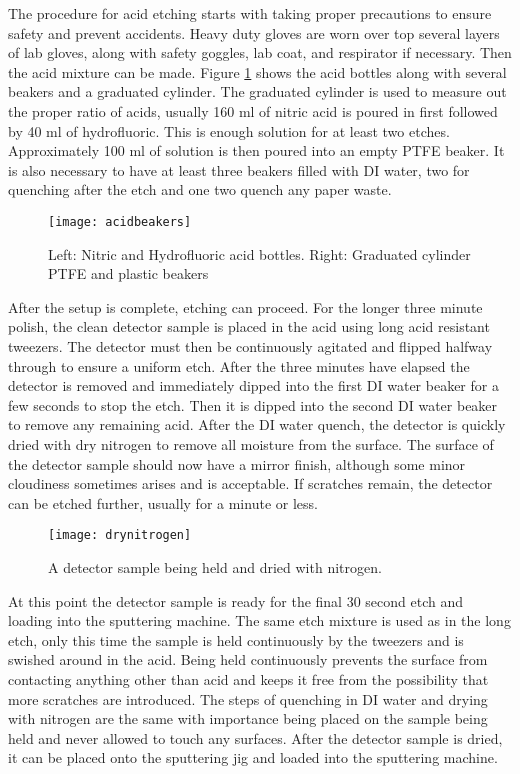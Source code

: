 The procedure for acid etching starts with taking proper precautions to ensure safety and prevent accidents.
Heavy duty gloves are worn over top several layers of lab gloves, along with safety goggles, lab coat, and respirator if necessary.
Then the acid mixture can be made.
Figure \ref{fig:acidbeakers} shows the acid bottles along with several beakers and a graduated cylinder.
The graduated cylinder is used to measure out the proper ratio of acids, usually 160 ml of nitric acid is poured in first followed by 40 ml of hydrofluoric.
This is enough solution for at least two etches.
Approximately 100 ml of solution is then poured into an empty PTFE beaker.
It is also necessary to have at least three beakers filled with DI water, two for quenching after the etch and one two quench any paper waste.
\begin{figure}[htpb]
\centering
\texttt{[image: acidbeakers]}
\caption{Left: Nitric and Hydrofluoric acid bottles. Right: Graduated cylinder PTFE and plastic beakers}
\label{fig:acidbeakers}
\end{figure}
After the setup is complete, etching can proceed.
For the longer three minute polish, the clean detector sample is placed in the acid using long acid resistant tweezers.
The detector must then be continuously agitated and flipped halfway through to ensure a uniform etch.
After the three minutes have elapsed the detector is removed and immediately dipped into the first DI water beaker for a few seconds to stop the etch.
Then it is dipped into the second DI water beaker to remove any remaining acid.
After the DI water quench, the detector is quickly dried with dry nitrogen to remove all moisture from the surface.
The surface of the detector sample should now have a mirror finish, although some minor cloudiness sometimes arises and is acceptable.
If scratches remain, the detector can be etched further, usually for a minute or less.
\begin{figure}[htpb]
\centering
\texttt{[image: drynitrogen]}
\caption{A detector sample being held and dried with nitrogen.}
\label{fig:drynitrogen}
\end{figure}

At this point the detector sample is ready for the final 30 second etch and loading into the sputtering machine.
The same etch mixture is used as in the long etch, only this time the sample is held continuously by the tweezers and is swished around in the acid.
Being held continuously prevents the surface from contacting anything other than acid and keeps it free from the possibility that more scratches are introduced.
The steps of quenching in DI water and drying with nitrogen are the same with importance being placed on the sample being held and never allowed to touch any surfaces.
After the detector sample is dried, it can be placed onto the sputtering jig and loaded into the sputtering machine.


